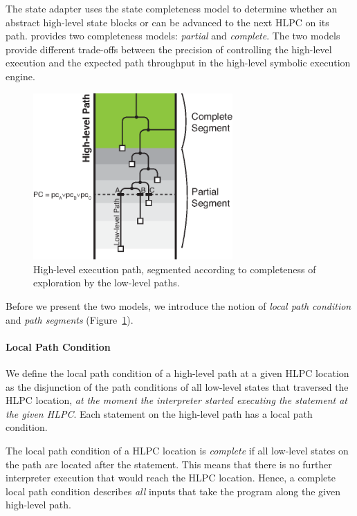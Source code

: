 The state adapter uses the state completeness model to determine whether an abstract high-level state blocks or can be advanced to the next HLPC on its path.
%
\chef provides two completeness models: \emph{partial} and \emph{complete}.
%
The two models provide different trade-offs between the precision of controlling the high-level execution and the expected path throughput in the high-level symbolic execution engine.

\begin{figure}
  \centering
  \includegraphics[width=3in]{chef/figures/path-segments}
  \caption{High-level execution path, segmented according to completeness of exploration by the low-level paths.}
  \label{fig:chef:path-segments}
\end{figure}

Before we present the two models, we introduce the notion of \emph{local path condition} and \emph{path segments} (Figure~\ref{fig:chef:path-segments}).

\paragraph{Local Path Condition}

We define the local path condition of a high-level path at a given HLPC location as the disjunction of the path conditions of all low-level states that traversed the HLPC location, \emph{at the moment the interpreter started executing the statement at the given HLPC}.
%
Each statement on the high-level path has a local path condition.

The local path condition of a HLPC location is \emph{complete} if all low-level states on the path are located after the statement.
%
This means that there is no further interpreter execution that would reach the HLPC location.
%
Hence, a complete local path condition describes \emph{all} inputs that take the program along the given high-level path.

